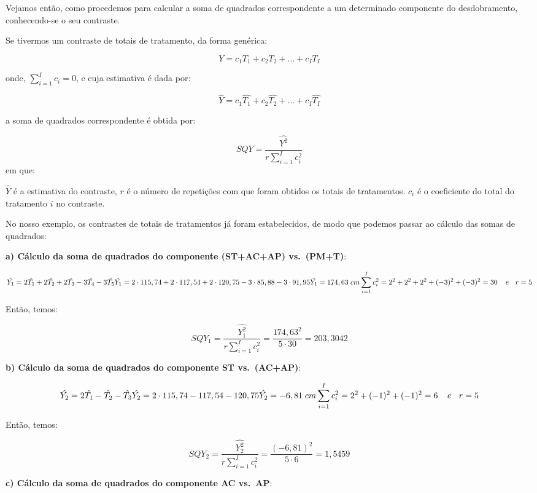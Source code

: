 \documentclass[
]{book}
\begin{document}
Vejamos então, como procedemos para calcular a soma de quadrados correspondente a um determinado componente do desdobramento, conhecendo-se o seu contraste.

Se tivermos um contraste de totais de tratamento, da forma genérica:

\[
Y=c_1T_1+c_2T_2+...+c_IT_I
\]

onde, \(\sum_{i=1}^Ic_i=0\), e cuja estimativa é dada por:

\[
\hat{Y}=c_1\hat{T_1}+c_2\hat{T_2}+...+c_I\hat{T_I}
\]

a soma de quadrados correspondente é obtida por:

\[
SQY=\frac{\hat{Y^2}}{r\sum_{i=1}^Ic_i^2}
\]
em que:

\(\hat{Y}\) é a estimativa do contraste,
\(r\) é o número de repetições com que foram obtidos os totais de tratamentos.
\(c_i\) é o coeficiente do total do tratamento \(i\) no contraste.

No nosso exemplo, os contrastes de totais de tratamentos já foram estabelecidos, de modo que podemos passar ao cálculo das somas de quadrados:

\textbf{a) Cálculo da soma de quadrados do componente (ST+AC+AP) vs.~(PM+T)}:

\[
\hat{Y_1}=2\hat{T_1}+2\hat{T_2}+2\hat{T_3}-3\hat{T_4}-3\hat{T_5} \\
\hat{Y_1}=2\cdot115,74+2\cdot117,54+2\cdot120,75-3\cdot85,88-3\cdot91,95\\
\hat{Y_1}=174,63\;cm\\
\sum_{i=1}^Ic_i^2=2^2+2^2+2^2+(-3)^2+(-3)^2=30\:\:\:\:\:e\:\:\:\:r=5
\]

Então, temos:

\[
SQY_1=\frac{\hat{Y_1^2}}{r\sum_{i=1}^Ic_i^2}=\frac{174,63^2}{5\cdot30}=203,3042
\]

\textbf{b) Cálculo da soma de quadrados do componente ST vs.~(AC+AP)}:

\[
\hat{Y_2}=2\hat{T_1}-\hat{T_2}-\hat{T_3} \\
\hat{Y_2}=2\cdot115,74-117,54-120,75\\
\hat{Y_2}=-6,81\;cm\\
\sum_{i=1}^Ic_i^2=2^2+(-1)^2+(-1)^2=6\:\:\:\:\:e\:\:\:\:r=5
\]

Então, temos:

\[
SQY_2=\frac{\hat{Y_2^2}}{r\sum_{i=1}^Ic_i^2}=\frac{(-6,81)^2}{5\cdot6}=1,5459
\]

\textbf{c) Cálculo da soma de quadrados do componente AC vs.~AP}:
\end{document}

